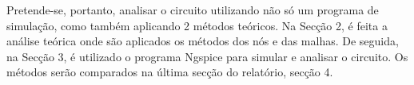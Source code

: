 Pretende-se, portanto, analisar o circuito utilizando não só um programa de simulação, como também aplicando 2 métodos teóricos. Na Secção 2, é feita a análise teórica onde são aplicados os métodos dos nós e das malhas. De seguida, na Secção 3, é utilizado o programa Ngspice para simular e analisar o circuito. Os métodos serão comparados na última secção do relatório, secção 4.




